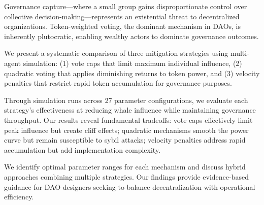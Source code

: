 
Governance capture---where a small group gains disproportionate control over collective decision-making---represents an existential threat to decentralized organizations. Token-weighted voting, the dominant mechanism in DAOs, is inherently plutocratic, enabling wealthy actors to dominate governance outcomes.

We present a systematic comparison of three mitigation strategies using multi-agent simulation: (1) vote caps that limit maximum individual influence, (2) quadratic voting that applies diminishing returns to token power, and (3) velocity penalties that restrict rapid token accumulation for governance purposes.

Through \experimentruns{} simulation runs across 27 parameter configurations, we evaluate each strategy's effectiveness at reducing whale influence while maintaining governance throughput. Our results reveal fundamental tradeoffs: vote caps effectively limit peak influence but create cliff effects; quadratic mechanisms smooth the power curve but remain susceptible to sybil attacks; velocity penalties address rapid accumulation but add implementation complexity.

We identify optimal parameter ranges for each mechanism and discuss hybrid approaches combining multiple strategies. Our findings provide evidence-based guidance for DAO designers seeking to balance decentralization with operational efficiency.
